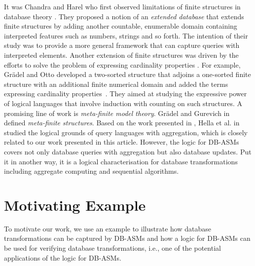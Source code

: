 \documentclass[preprint,11pt]{elsarticle}
\theoremstyle{definition}
\theoremstyle{remark}
\begin{document}
It was Chandra and Harel who first observed limitations of finite
structures in database theory \cite{ChandraCompleteness}. They
proposed a notion of an \emph{extended database} that extends finite
structures by adding another countable, enumerable domain containing
interpreted features such as numbers, strings and so forth. The
intention of their study was to provide a more general framework
that can capture queries with interpreted elements.
Another extension of finite structures was driven by the efforts
to solve the problem of expressing cardinality properties
\cite{Yuri02onpolynomial,CaiIFP+C89,GrCounting,Immerman87,Otto95b,Otto96,Torres01,Torres02}.
For example, Gr\"adel and Otto developed a two-sorted structure that
adjoins a one-sorted finite structure with an additional finite
numerical domain and added the terms expressing cardinality
properties~\cite{GrCounting}. They aimed at studying the expressive power
of logical languages that involve induction with counting on such
structures. A promising line of work is \emph{meta-finite model
theory}. Gr\"adel and Gurevich in \cite{graedel:infcomp1998} defined
\emph{meta-finite structures}.
Based
on the work presented in \cite{graedel:infcomp1998}, Hella et al. in
\cite{HellaAggregateLogics} studied the logical grounds of query
languages with aggregation, which is closely related to our work presented in
this article. However, the logic for DB-ASMs covers not only
database queries with aggregation but also database updates. Put it in
another way, it is a logical characterisation for database
transformations including aggregate computing and sequential algorithms.



\section{Motivating Example}\label{sec:motivation}
To motivate our work, we use an example to illustrate how database
transformations can be captured by DB-ASMs and how a logic for
DB-ASMs can be used for verifying database transformations, i.e., one of the potential applications of the logic for DB-ASMs.
\end{document}
